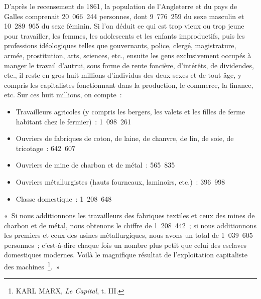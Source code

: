 \documentclass[french,twoside]{book} %
\newenvironment{quoteblock}%
  {\begin{quoting}}
  {\end{quoting}}
\newenvironment{quotebar}{%
    \def\FrameCommand{{\color{rubric!10!}\vrule width 0.5em} \hspace{0.9em}}%
    \def\OuterFrameSep{\itemsep} %
    \MakeFramed {\advance\hsize-\width \FrameRestore}
  }%
  {%
    \endMakeFramed
  }
\renewenvironment{quoteblock}%
  {%
    \savenotes
    \setstretch{0.9}
    \normalfont
    \begin{quotebar}
  }
  {%
    \end{quotebar}
    \spewnotes
  }
\begin{document}
\begin{quoteblock}
 \noindent D’après le recensement de 1861, la population de l’Angleterre et du pays de Galles comprenait 20 066 244 personnes, dont 9 776 259 du sexe masculin et 10 289 965 du sexe féminin. Si l’on déduit ce qui est trop vieux ou trop jeune pour travailler, les femmes, les adolescents et les enfants improductifs, puis les professions idéologiques telles que gouvernants, police, clergé, magistrature, armée, prostitution, arts, sciences, etc., ensuite les gens exclusivement occupés à manger le travail d’autrui, sous forme de rente foncière, d’intérêts, de dividendes, etc., il reste en gros huit millions d’individus des deux sexes et de tout âge, y compris les capitalistes fonctionnant dans la production, le commerce, la finance, etc. Sur ces huit millions, on compte :\par
 
\begin{itemize}[itemsep=0pt,]
\item Travailleurs agricoles (y compris les bergers, les valets et les filles de ferme habitant chez le fermier) : 1 098 261
\item Ouvriers de fabriques de coton, de laine, de chanvre, de lin, de soie, de tricotage : 642 607
\item Ouvriers de mine de charbon et de métal : 565 835
\item Ouvriers métallurgistes (hauts fourneaux, laminoirs, etc.) : 396 998
\item Classe domestique : 1 208 648
\end{itemize}

 \noindent « Si nous additionnons les travailleurs des fabriques textiles et ceux des mines de charbon et de métal, nous obtenons le chiffre de 1 208 442 ; si nous additionnons les premiers et ceux des usines métallurgiques, nous avons un total de 1 039 605 personnes ; c’est-à-dire chaque fois un nombre plus petit que celui des esclaves domestiques modernes. Voilà le magnifique résultat de l’exploitation capitaliste des machines \footnote{KARL MARX, \emph{Le Capital}, t. III.}. »
\end{quoteblock}
\end{document}

